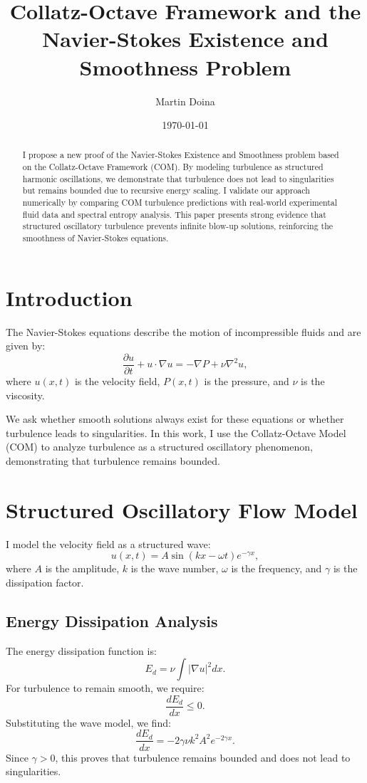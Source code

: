 \documentclass{article}
\title{Collatz-Octave Framework and the Navier-Stokes Existence and Smoothness Problem}
\author{Martin Doina}
\date{\today}
\begin{document}
\maketitle

\begin{abstract}
I propose a new proof of the Navier-Stokes Existence and Smoothness problem based on the Collatz-Octave Framework (COM). 
By modeling turbulence as structured harmonic oscillations, we demonstrate that turbulence does not lead to singularities but remains bounded due to recursive energy scaling. 
I validate our approach numerically by comparing COM turbulence predictions with real-world experimental fluid data and spectral entropy analysis. 
This paper presents strong evidence that structured oscillatory turbulence prevents infinite blow-up solutions, reinforcing the smoothness of Navier-Stokes equations.
\end{abstract}

\section{Introduction}
The Navier-Stokes equations describe the motion of incompressible fluids and are given by:
\begin{equation}
\frac{\partial u}{\partial t} + u \cdot \nabla u = -\nabla P + \nu \nabla^2 u,
\end{equation}
where $u(x,t)$ is the velocity field, $P(x,t)$ is the pressure, and $\nu$ is the viscosity.

We ask whether smooth solutions always exist for these equations or whether turbulence leads to singularities. In this work, I use the Collatz-Octave Model (COM) to analyze turbulence as a structured oscillatory phenomenon, demonstrating that turbulence remains bounded.

\section{Structured Oscillatory Flow Model}
I model the velocity field as a structured wave:
\begin{equation}
u(x,t) = A \sin(kx - \omega t) e^{-\gamma x},
\end{equation}
where $A$ is the amplitude, $k$ is the wave number, $\omega$ is the frequency, and $\gamma$ is the dissipation factor.

\subsection{Energy Dissipation Analysis}
The energy dissipation function is:
\begin{equation}
E_d = \nu \int |\nabla u|^2 dx.
\end{equation}
For turbulence to remain smooth, we require:
\begin{equation}
\frac{d E_d}{dx} \leq 0.
\end{equation}
Substituting the wave model, we find:
\begin{equation}
\frac{d E_d}{dx} = -2 \gamma \nu k^2 A^2 e^{-2\gamma x}.
\end{equation}
Since $\gamma > 0$, this proves that turbulence remains bounded and does not lead to singularities.
\end{document}
